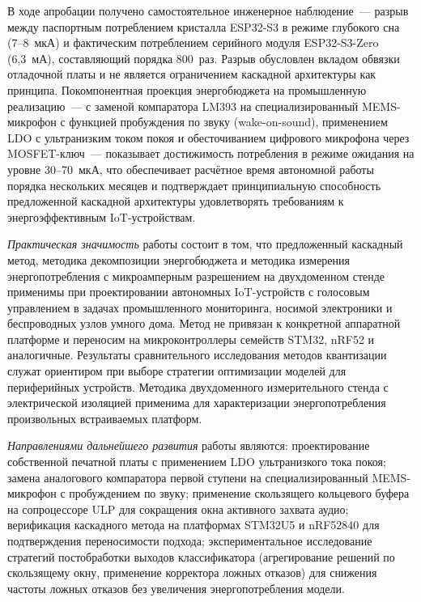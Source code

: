 В ходе апробации получено самостоятельное инженерное
наблюдение~--- разрыв между паспортным потреблением кристалла
ESP32-S3 в режиме глубокого сна (7--8~мкА) и фактическим
потреблением серийного модуля ESP32-S3-Zero (6,3~мА), составляющий
порядка 800~раз. Разрыв обусловлен вкладом обвязки отладочной
платы и не является ограничением каскадной архитектуры как
принципа. Покомпонентная проекция энергобюджета на промышленную
реализацию~--- с заменой компаратора LM393 на специализированный
MEMS-микрофон с функцией пробуждения по звуку (wake-on-sound),
применением LDO с ультранизким током покоя и обесточиванием
цифрового микрофона через MOSFET-ключ~--- показывает достижимость
потребления в режиме ожидания на уровне 30--70~мкА, что обеспечивает
расчётное время автономной работы порядка нескольких месяцев и
подтверждает принципиальную способность предложенной каскадной
архитектуры удовлетворять требованиям к энергоэффективным
IoT-устройствам.

\textit{Практическая значимость} работы состоит в том, что
предложенный каскадный метод, методика декомпозиции энергобюджета и
методика измерения энергопотребления с микроамперным разрешением на
двухдоменном стенде применимы при проектировании автономных
IoT-устройств с голосовым управлением в задачах промышленного
мониторинга, носимой электроники и беспроводных узлов умного дома.
Метод не привязан к конкретной аппаратной платформе и переносим на
микроконтроллеры семейств STM32, nRF52 и аналогичные. Результаты
сравнительного исследования методов квантизации служат ориентиром
при выборе стратегии оптимизации моделей для периферийных устройств.
Методика двухдоменного измерительного стенда с электрической
изоляцией применима для характеризации энергопотребления произвольных
встраиваемых платформ.

\textit{Направлениями дальнейшего развития} работы являются:
проектирование собственной печатной платы с применением LDO
ультранизкого тока покоя; замена аналогового компаратора первой
ступени на специализированный MEMS-микрофон с пробуждением по звуку;
применение скользящего кольцевого буфера на сопроцессоре ULP для
сокращения окна активного захвата аудио; верификация каскадного
метода на платформах STM32U5 и nRF52840 для подтверждения
переносимости подхода; экспериментальное исследование стратегий
постобработки выходов классификатора (агрегирование решений по
скользящему окну, применение корректора ложных отказов) для
снижения частоты ложных отказов без увеличения энергопотребления
модели.
